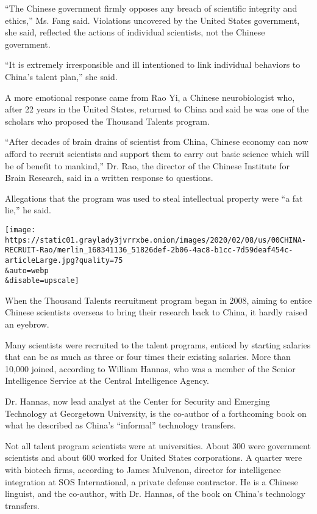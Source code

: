 ``The Chinese government firmly opposes any breach of scientific
integrity and ethics,'' Ms. Fang said. Violations uncovered by the
United States government, she said, reflected the actions of individual
scientists, not the Chinese government.

``It is extremely irresponsible and ill intentioned to link individual
behaviors to China's talent plan,'' she said.

A more emotional response came from Rao Yi, a Chinese neurobiologist
who, after 22 years in the United States, returned to China and said he
was one of the scholars who proposed the Thousand Talents program.

``After decades of brain drains of scientist from China, Chinese economy
can now afford to recruit scientists and support them to carry out basic
science which will be of benefit to mankind,'' Dr. Rao, the director of
the Chinese Institute for Brain Research, said in a written response to
questions.

Allegations that the program was used to steal intellectual property
were ``a fat lie,'' he said.

\texttt{[image: https://static01.graylady3jvrrxbe.onion/images/2020/02/08/us/00CHINA-RECRUIT-Rao/merlin\_168341136\_51826def-2b06-4ac8-b1cc-7d59deaf454c-articleLarge.jpg?quality=75\\\&auto=webp\\\&disable=upscale]}

When the Thousand Talents recruitment program began in 2008, aiming to
entice Chinese scientists overseas to bring their research back to
China, it hardly raised an eyebrow.

Many scientists were recruited to the talent programs, enticed by
starting salaries that can be as much as three or four times their
existing salaries. More than 10,000 joined, according to William Hannas,
who was a member of the Senior Intelligence Service at the Central
Intelligence Agency.

Dr. Hannas, now lead analyst at the Center for Security and Emerging
Technology at Georgetown University, is the co-author of a forthcoming
book on what he described as China's ``informal'' technology transfers.

Not all talent program scientists were at universities. About 300 were
government scientists and about 600 worked for United States
corporations. A quarter were with biotech firms, according to James
Mulvenon, director for intelligence integration at SOS International, a
private defense contractor. He is a Chinese linguist, and the co-author,
with Dr. Hannas, of the book on China's technology transfers.


